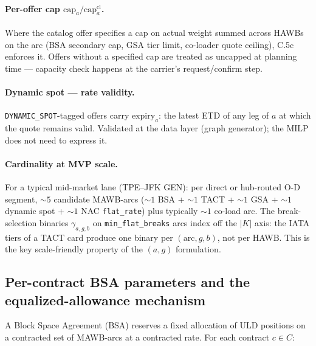 \documentclass[11pt,a4paper]{article}
\theoremstyle{definition}
\begin{document}
\paragraph{Per-offer cap $\text{cap}_a / \text{cap}_a^{\text{cl}}$.}
Where the catalog offer specifies a cap on actual weight summed across HAWBs
on the arc (BSA secondary cap, GSA tier limit, co-loader quote ceiling), C.5c
enforces it. Offers without a specified cap are treated as uncapped at
planning time --- capacity check happens at the carrier's request/confirm step.

\paragraph{Dynamic spot --- rate validity.}
\texttt{DYNAMIC\_SPOT}-tagged offers carry $\text{expiry}_a$: the latest ETD
of any leg of $a$ at which the quote remains valid. Validated at the data
layer (graph generator); the MILP does not need to express it.

\paragraph{Cardinality at MVP scale.}
For a typical mid-market lane (TPE--JFK GEN): per direct or hub-routed O-D
segment, $\sim 5$ candidate MAWB-arcs ($\sim 1$ BSA + $\sim 1$ TACT + $\sim 1$
GSA + $\sim 1$ dynamic spot + $\sim 1$ NAC \texttt{flat\_rate}) plus typically
$\sim 1$ co-load arc. The break-selection binaries $\gamma_{a,g,b}$ on
\texttt{min\_flat\_breaks} arcs index off the $|K|$ axis: the IATA tiers of a
TACT card produce one binary per $(\text{arc}, g, b)$, not per HAWB. This is
the key scale-friendly property of the $(a, g)$ formulation.

\subsection{Per-contract BSA parameters and the equalized-allowance mechanism}
\label{sec:bsa-params}

A Block Space Agreement (BSA) reserves a fixed allocation of ULD positions on
a contracted set of MAWB-arcs at a contracted rate. For each contract $c \in
C$:
\end{document}
